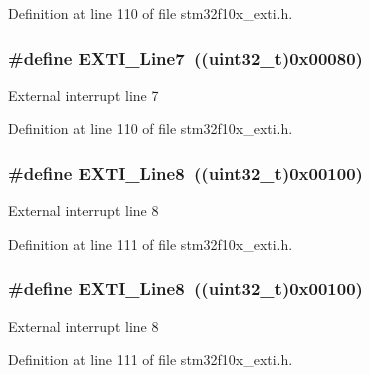 Definition at line 110 of file stm32f10x\+\_\+exti.\+h.

\subsubsection[{\texorpdfstring{E\+X\+T\+I\+\_\+\+Line7}{EXTI_Line7}}]{\setlength{\rightskip}{0pt plus 5cm}\#define E\+X\+T\+I\+\_\+\+Line7~(({\bf uint32\+\_\+t})0x00080)}\hypertarget{group___e_x_t_i___lines_ga3b7155d54a4a98394b599718901ccbe5}{}\label{group___e_x_t_i___lines_ga3b7155d54a4a98394b599718901ccbe5}
External interrupt line 7 

Definition at line 110 of file stm32f10x\+\_\+exti.\+h.

\subsubsection[{\texorpdfstring{E\+X\+T\+I\+\_\+\+Line8}{EXTI_Line8}}]{\setlength{\rightskip}{0pt plus 5cm}\#define E\+X\+T\+I\+\_\+\+Line8~(({\bf uint32\+\_\+t})0x00100)}\hypertarget{group___e_x_t_i___lines_gacd51e087a088c3315049394cddf79e88}{}\label{group___e_x_t_i___lines_gacd51e087a088c3315049394cddf79e88}
External interrupt line 8 

Definition at line 111 of file stm32f10x\+\_\+exti.\+h.

\subsubsection[{\texorpdfstring{E\+X\+T\+I\+\_\+\+Line8}{EXTI_Line8}}]{\setlength{\rightskip}{0pt plus 5cm}\#define E\+X\+T\+I\+\_\+\+Line8~(({\bf uint32\+\_\+t})0x00100)}\hypertarget{group___e_x_t_i___lines_gacd51e087a088c3315049394cddf79e88}{}\label{group___e_x_t_i___lines_gacd51e087a088c3315049394cddf79e88}
External interrupt line 8 

Definition at line 111 of file stm32f10x\+\_\+exti.\+h.

